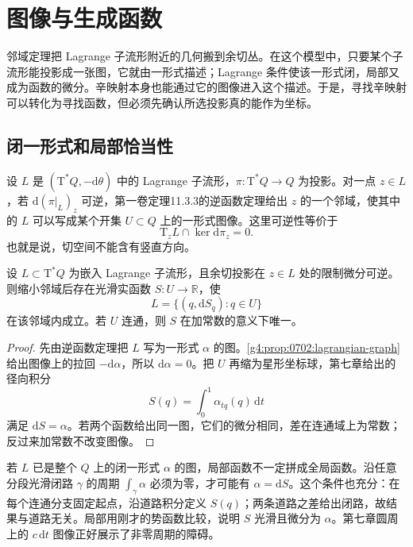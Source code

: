 
% 
% 

\section{图像与生成函数}
\label{g4:sec:0804}

邻域定理把 Lagrange 子流形附近的几何搬到余切丛。在这个模型中，只要某个子流形能投影成一张图，它就由一形式描述；Lagrange 条件使该一形式闭，局部又成为函数的微分。辛映射本身也能通过它的图像进入这个描述。于是，寻找辛映射可以转化为寻找函数，但必须先确认所选投影真的能作为坐标。

\subsection{闭一形式和局部恰当性}
\label{g4:subsec:0804:01}

设 \(L\) 是 \((\mathrm{T}^*Q,-\mathrm{d}\theta)\) 中的 Lagrange 子流形，\(\pi:\mathrm{T}^*Q\to Q\) 为投影。对一点 \(z\in L\)，若 \(\mathrm{d}(\pi|_L)_z\) 可逆，第一卷定理11.3.3的逆函数定理给出 \(z\) 的一个邻域，使其中的 \(L\) 可以写成某个开集 \(U\subset Q\) 上的一形式图像。这里可逆性等价于
\[
	\mathrm{T}_zL\cap\ker\mathrm{d}\pi_z=0.
\]
也就是说，切空间不能含有竖直方向。

\begin{proposition}\label{g4:prop:0804:local-graph}
	设 \(L\subset\mathrm{T}^*Q\) 为嵌入 Lagrange 子流形，且余切投影在 \(z\in L\) 处的限制微分可逆。则缩小邻域后存在光滑实函数 \(S:U\to\mathbb R\)，使
	\[
		L=\{(q,\mathrm{d}S_q):q\in U\}
	\]
	在该邻域内成立。若 \(U\) 连通，则 \(S\) 在加常数的意义下唯一。
\end{proposition}
\begin{proof}
	先由逆函数定理把 \(L\) 写为一形式 \(\alpha\) 的图。\cref{g4:prop:0702:lagrangian-graph}给出图像上的拉回 \(-\mathrm{d}\alpha\)，所以 \(\mathrm{d}\alpha=0\)。把 \(U\) 再缩为星形坐标球，第七章给出的径向积分
	\[
		S(q)=\int_0^1\alpha_{tq}(q)\,\mathrm{d}t
	\]
	满足 \(\mathrm{d}S=\alpha\)。若两个函数给出同一图，它们的微分相同，差在连通域上为常数；反过来加常数不改变图像。
\end{proof}

若 \(L\) 已是整个 \(Q\) 上的闭一形式 \(\alpha\) 的图，局部函数不一定拼成全局函数。沿任意分段光滑闭路 \(\gamma\) 的周期 \(\int_\gamma\alpha\) 必须为零，才可能有 \(\alpha=\mathrm{d}S\)。这个条件也充分：在每个连通分支固定起点，沿道路积分定义 \(S(q)\)；两条道路之差给出闭路，故结果与道路无关。局部用刚才的势函数比较，说明 \(S\) 光滑且微分为 \(\alpha\)。第七章圆周上的 \(c\,\mathrm{d}t\) 图像正好展示了非零周期的障碍。

